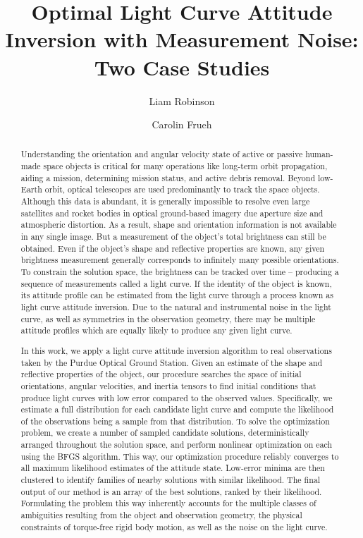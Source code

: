 \documentclass[a4paper,twocolumn]{spaceDebrisC} %
\title{Optimal Light Curve Attitude Inversion with Measurement Noise: Two Case Studies}
\author{Liam Robinson}
\author{Carolin Frueh}
\affil{Purdue University, West Lafayette, United States, Email: \texttt{\{robin502, cfrueh\}$@$purdue.edu}}
\begin{document}

\maketitle

\begin{abstract}

Understanding the orientation and angular velocity state of active or passive human-made space objects is critical for many operations like long-term orbit propagation, aiding a mission, determining mission status, and active debris removal. Beyond low-Earth orbit, optical telescopes are used predominantly to track the space objects. Although this data is abundant, it is generally impossible to resolve even large satellites and rocket bodies in optical ground-based imagery due aperture size and atmospheric distortion. As a result, shape and orientation information is not available in any single image. But a measurement of the object's total brightness can still be obtained. Even if the object's shape and reflective properties are known, any given brightness measurement generally corresponds to infinitely many possible orientations. To constrain the solution space, the brightness can be tracked over time -- producing a sequence of measurements called a light curve. If the identity of the object is known, its attitude profile can be estimated from the light curve through a process known as light curve attitude inversion. Due to the natural and instrumental noise in the light curve, as well as symmetries in the observation geometry, there may be multiple attitude profiles which are equally likely to produce any given light curve.

In this work, we apply a light curve attitude inversion algorithm to real observations taken by the Purdue Optical Ground Station. Given an estimate of the shape and reflective properties of the object, our procedure searches the space of initial orientations, angular velocities, and inertia tensors to find initial conditions that produce light curves with low error compared to the observed values. Specifically, we estimate a full distribution for each candidate light curve and compute the likelihood of the observations being a sample from that distribution. To solve the optimization problem, we create a number of sampled candidate solutions, deterministically arranged throughout the solution space, and perform nonlinear optimization on each using the BFGS algorithm. This way, our optimization procedure reliably converges to all maximum likelihood estimates of the attitude state. Low-error minima are then clustered to identify families of nearby solutions with similar likelihood. The final output of our method is an array of the best solutions, ranked by their likelihood. Formulating the problem this way inherently accounts for the multiple classes of ambiguities resulting from the object and observation geometry, the physical constraints of torque-free rigid body motion, as well as the noise on the light curve.


\end{abstract}
\end{document}
